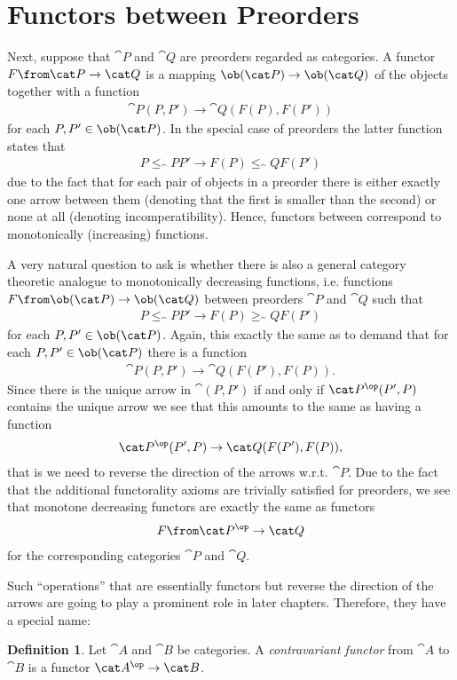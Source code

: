 \documentclass{article}
\theoremstyle{definition}
\newtheorem{definition}{Definition}
\begin{document}
\section{Functors between Preorders}
Next, suppose that $\cat P$ and $\cat Q$ are preorders regarded as categories. A functor $F\from\cat P\to\cat Q$ is a mapping $\ob(\cat P)\to\ob(\cat Q)$ of the objects together with a function
\begin{align*}
  \cat P(P,P')\to\cat Q(F(P),F(P'))
\end{align*}
for each $P,P'\in\ob(\cat P)$. In the special case of preorders the latter function states that
\begin{align*}
  P\leq_\cat P P'\rightarrow F(P)\leq_\cat Q F(P')
\end{align*}
due to the fact that for each pair of objects in a preorder there is either exactly one arrow between them (denoting that the first is smaller than the second) or none at all (denoting incomperatibility). Hence, functors between correspond to monotonically (increasing) functions.

A very natural question to ask is whether there is also a general category theoretic analogue to monotonically decreasing functions, i.e. functions $F\from\ob(\cat P)\to\ob(\cat Q)$ between preorders $\cat P$ and $\cat Q$ such that
\begin{align*}
  P\leq_\cat P P'\rightarrow F(P)\geq_\cat Q F(P')
\end{align*}
for each $P,P'\in\ob(\cat P)$. Again, this exactly the same as to demand that for each $P,P'\in\ob(\cat P)$ there is a function
\begin{align*}
  \cat P(P,P')\to\cat Q(F(P'),F(P)).
\end{align*}
Since there is the unique arrow in $\cat (P,P')$ if and only if $\cat P^\op(P',P)$ contains the unique arrow we see that this amounts to the same as having a function
\begin{align*}
  \cat P^\op(P',P)\to\cat Q(F(P'),F(P)),
\end{align*}
that is we need to reverse the direction of the arrows w.r.t. $\cat P$. Due to the fact that the additional functorality axioms are trivially satisfied for preorders, we see that monotone decreasing functors are exactly the same as functors
\begin{align*}
  F\from\cat P^\op\to\cat Q
\end{align*}
for the corresponding categories $\cat P$ and $\cat Q$.

Such ``operations'' that are essentially functors but reverse the direction of the arrows are going to play a prominent role in later chapters. Therefore, they have a special name:
\begin{definition}
  Let $\cat A$ and $\cat B$ be categories. A \emph{contravariant functor} from $\cat A$ to $\cat B$ is a functor $\cat A^\op\to\cat B$.
\end{definition}
\end{document}
